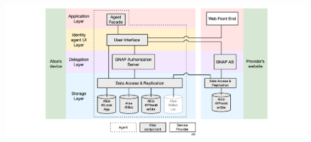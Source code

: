 \documentclass[11pt, oneside]{article}   	%
\begin{document}
\includegraphics[width=\textwidth]{./images/meetalk.png}
 
    


\end{document}
